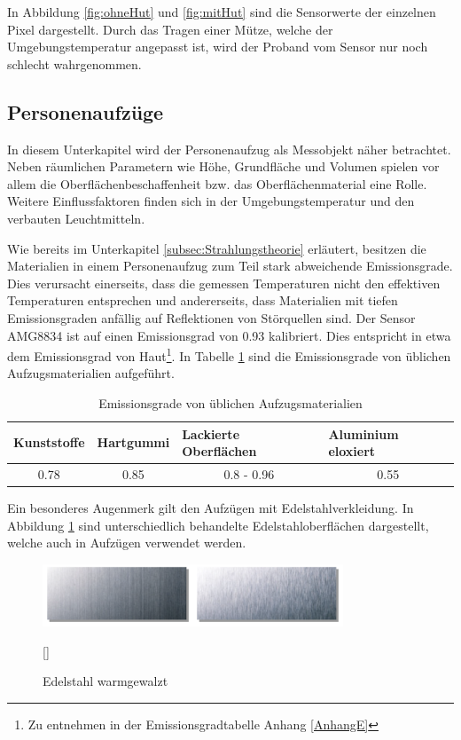 In Abbildung \ref{fig:ohneHut} und \ref{fig:mitHut} sind die Sensorwerte der einzelnen Pixel dargestellt. Durch das Tragen einer Mütze, welche der Umgebungstemperatur angepasst ist, wird der Proband vom Sensor nur noch schlecht wahrgenommen.

\subsection{Personenaufzüge}
\label{subsec:Personenaufzuege}
In diesem Unterkapitel wird der Personenaufzug als Messobjekt näher betrachtet. Neben räumlichen Parametern wie Höhe, Grundfläche und Volumen spielen vor allem die Oberflächenbeschaffenheit bzw. das Oberflächenmaterial eine Rolle. Weitere Einflussfaktoren finden sich in der Umgebungstemperatur und den verbauten Leuchtmitteln.

Wie bereits im Unterkapitel \ref{subsec:Strahlungstheorie} erläutert, besitzen die Materialien in einem Personenaufzug zum Teil stark abweichende Emissionsgrade. Dies verursacht einerseits, dass die gemessen Temperaturen nicht den effektiven Temperaturen entsprechen und andererseits, dass Materialien mit tiefen Emissionsgraden anfällig auf Reflektionen von Störquellen sind. Der Sensor AMG8834 ist auf einen Emissionsgrad von 0.93 kalibriert. Dies entspricht in etwa dem Emissionsgrad von Haut\footnote[10]{Zu entnehmen in der Emissionsgradtabelle Anhang \ref{AnhangE}}. In Tabelle \ref{tab:Emission} sind die Emissionsgrade von üblichen Aufzugsmaterialien aufgeführt.
	
\begin{table}[H]
	\centering
	\caption[Emissionsgrade von üblichen Aufzugsmaterialien]{Emissionsgrade von üblichen Aufzugsmaterialien}
	\label{tab:Emission}
	\begin{tabular}{|l|l|l|l|}
		\hline
		\rowcolor[HTML]{C0C0C0} 
		Kunststoffe                & Hartgummi                 & Lackierte Oberflächen           & Aluminium eloxiert        \\ \hline
		\multicolumn{1}{|c|}{0.78} & \multicolumn{1}{c|}{0.85} & \multicolumn{1}{c|}{0.8 - 0.96} & \multicolumn{1}{c|}{0.55} \\ \hline
	\end{tabular}
\end{table}
	

Ein besonderes Augenmerk gilt den Aufzügen mit Edelstahlverkleidung. In Abbildung \ref{fig:Edelstahl} sind unterschiedlich behandelte Edelstahloberflächen dargestellt, welche auch in Aufzügen verwendet werden.  
\begin{figure}[H]
	\centering
	\includegraphics[width=0.8\textwidth]
	{fig/Edelstahl_matt.PNG}
	\caption[Edelstahl warmgewalzt]{Edelstahl warmgewalzt} [\protect\cite{Edelstahl}]
	\label{fig:Edelstahl}
\end{figure}


